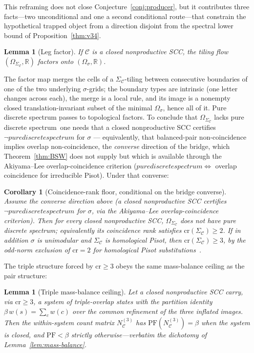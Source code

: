 \documentclass[11pt]{article}
\theoremstyle{plain}
\newtheorem{lemma}[theorem]{Lemma}
\newtheorem{corollary}[theorem]{Corollary}
\theoremstyle{definition}
\theoremstyle{remark}
\newcommand{\PDS}{pure discrete spectrum}
\newcommand{\R}{\mathbb{R}}
\newcommand{\C}{\mathcal{C}}
\newcommand{\PFroot}{\mathrm{PF}}
\begin{document}
This reframing does not close Conjecture~\ref{conj:producer}, but it contributes three facts---two unconditional and one a second conditional route---that constrain the hypothetical trapped object from a direction disjoint from the spectral lower bound of Proposition~\ref{thm:v34}.

\begin{lemma}[Leg factor]\label{lem:leg-factor}
If $\C$ is a closed nonproductive SCC, the tiling flow $(\Omega_{\Sigma_\C},\R)$ factors onto $(\Omega_\sigma,\R)$.
\end{lemma}

\noindent The factor map merges the cells of a $\Sigma_\C$-tiling between consecutive boundaries of one of the two underlying $\sigma$-grids; the boundary types are intrinsic (one letter changes across each), the merge is a local rule, and its image is a nonempty closed translation-invariant subset of the minimal $\Omega_\sigma$, hence all of it. Pure discrete spectrum passes to topological factors. To conclude that $\Omega_{\Sigma_\C}$ lacks \PDS\ one needs that a closed nonproductive SCC certifies $\neg\PDS$ for $\sigma$ --- equivalently, that balanced-pair non-coincidence implies overlap non-coincidence, the \emph{converse} direction of the bridge, which Theorem~\ref{thm:BSW} does not supply but which is available through the Akiyama--Lee overlap-coincidence criterion ($\PDS\Leftrightarrow$ overlap coincidence for irreducible Pisot). Under that converse:

\begin{corollary}[Coincidence-rank floor, conditional on the bridge converse]\label{cor:cr-floor}
Assume the converse direction above (a closed nonproductive SCC certifies $\neg\PDS$ for $\sigma$, via the Akiyama--Lee overlap-coincidence criterion). Then for every closed nonproductive SCC, $\Omega_{\Sigma_\C}$ does not have \PDS; equivalently its coincidence rank satisfies $\mathrm{cr}(\Sigma_\C)\ge 2$. If in addition $\sigma$ is unimodular and $\Sigma_\C$ is homological Pisot, then $\mathrm{cr}(\Sigma_\C)\ge 3$, by the odd-norm exclusion of $\mathrm{cr}=2$ for homological Pisot substitutions~\textup{\cite{Barge2016}}.
\end{corollary}

The triple structure forced by $\mathrm{cr}\ge 3$ obeys the same mass-balance ceiling as the pair structure:

\begin{lemma}[Triple mass-balance ceiling]\label{lem:triple-ceiling}
Let a closed nonproductive SCC carry, via $\mathrm{cr}\ge 3$, a system of triple-overlap states with the partition identity $\beta\,w(s)=\sum_{c}w(c)$ over the common refinement of the three inflated images. Then the within-system count matrix $N_\C^{(3)}$ has $\PFroot(N_\C^{(3)})=\beta$ when the system is closed, and $\PFroot<\beta$ strictly otherwise---verbatim the dichotomy of Lemma~\ref{lem:mass-balance}.
\end{lemma}
\end{document}
